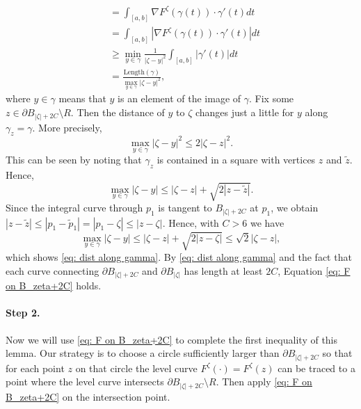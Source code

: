 \documentclass[11pt]{article}
\makeatletter
\renewenvironment{proof}[1][\proofname]{
   \par\pushQED{\qed}\normalfont
   \topsep6\p@\@plus6\p@\relax
   \trivlist\item[\hskip\labelsep\bfseries#1\@addpunct{.}]
   \ignorespaces
}{
   \popQED\endtrivlist\@endpefalse
}
\numberwithin{equation}{section}
\makeatother
\begin{document}
\begin{proof}
\begin{equation}
\begin{split}
      &= \int_{[a,b]} \nabla F^{\zeta}(\gamma(t)) \cdot \gamma '(t) dt\\
      &=  \int_{[a,b]} |\nabla F^{\zeta}(\gamma(t)) \cdot \gamma '(t)| dt \\
      & \geq \min_{y \in \gamma} \frac{1}{|\zeta - y|^2}
        \int_{[a,b]} |\gamma ' (t)| dt \\
      &= \frac{\text{Length}(\gamma)}
            {\max_{y \in \gamma} |\zeta - y|^2},
    \end{split}
  \end{equation}
  where $y \in \gamma$ means that $y$ is an
  element of the image of $\gamma$. 
  Fix some \hbox{$z \in \partial B_{|\zeta|+2C} \setminus R$}.
  Then the distance of $y$ to $\zeta$ changes just 
  a little for $y$ along $\gamma_z = \gamma$. More precisely, 
  \begin{equation}\label{eq: dist along gamma}
    \max_{y \in \gamma} |\zeta - y|^2 
    \leq 2 |\zeta - z|^2.
  \end{equation}
  This can be seen by noting that $\gamma_z$ is contained 
  in a square with vertices $z$ and $\tilde{z}$. Hence,
  \begin{equation}\nonumber
    \max_{y \in \gamma} |\zeta - y| 
    \leq |\zeta - z| + \sqrt{2|z - \tilde{z}|}.
  \end{equation}
  Since the integral curve through $p_1$ 
  is tangent to $B_{|\zeta|+2C}$ at $p_1$, we obtain 
  $|z - \tilde{z}| \leq |p_1 - \tilde{p}_1| = |p_1 - \zeta| \leq |z - \zeta|.$
  Hence, with $C>6$ we have
  \begin{equation}\nonumber
    \max_{y \in \gamma} |\zeta - y|  
      \leq |\zeta - z| + \sqrt{2|z - \zeta|}
      \leq \sqrt{2} |\zeta - z|,
  \end{equation} 
  which shows \eqref{eq: dist along gamma}. 
  By \eqref{eq: dist along gamma} and the fact that each curve connecting 
  $\partial B_{|\zeta| + 2C}$ and $\partial B_{|\zeta|}$ has 
  length at least $2C$, Equation \eqref{eq: F on B_zeta+2C} holds. 
  \paragraph{Step 2.} 
  Now we will use \eqref{eq: F on B_zeta+2C} to 
  complete the first inequality of this lemma. 
  Our strategy is to choose a circle sufficiently larger 
  than $\partial B_{|\zeta|+2C}$ so that for each point $z$ on that 
  circle the level curve $F^{\zeta}(\cdot) = F^{\zeta}(z)$ can be traced to 
  a point where the level curve intersects $\partial B_{|\zeta|+2C} \setminus R$. 
  Then apply \eqref{eq: F on B_zeta+2C} on the intersection point. 


\end{proof}
\end{document}
